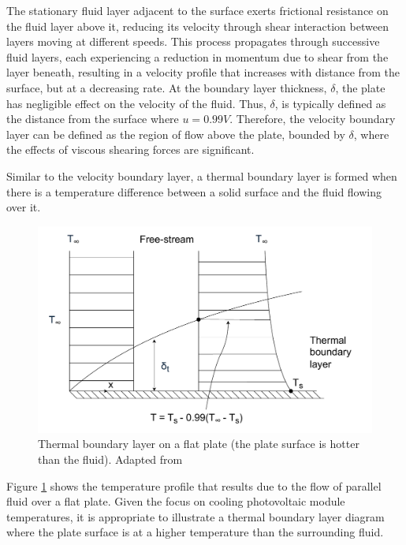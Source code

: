 The stationary fluid layer adjacent to the surface exerts frictional resistance on the fluid layer above it, reducing its velocity through shear interaction between layers moving at different speeds. This process propagates through successive fluid layers, each experiencing a reduction in momentum due to shear from the layer beneath, resulting in a velocity profile that increases with distance from the surface, but at a decreasing rate. At the boundary layer thickness, $\delta$, the plate has negligible effect on the velocity of the fluid. Thus, $\delta$, is typically defined as the distance from the surface where $u = 0.99V$. Therefore, the velocity boundary layer can be defined as the region of flow above the plate, bounded by $\delta$, where the effects of viscous shearing forces are significant.\vspace{0.5em}

Similar to the velocity boundary layer, a thermal boundary layer is formed when there is a temperature difference between a solid surface and the fluid flowing over it.\par

\begin{figure}[ht]
    \centering
    \includegraphics[width=0.75\linewidth]{Figures/thermal_boundary_layer.pdf}
    \caption{Thermal boundary layer on a flat plate (the plate surface is hotter than the fluid). Adapted from \cite{Cengel2014FundamentalsConvection}}
    \label{fig:thermal_boundary_layer}
\end{figure}

Figure \ref{fig:thermal_boundary_layer} shows the temperature profile that results due to the flow of parallel fluid over a flat plate. Given the focus on cooling photovoltaic module temperatures, it is appropriate to illustrate a thermal boundary layer diagram where the plate surface is at a higher temperature than the surrounding fluid.\vspace{0.5em}

